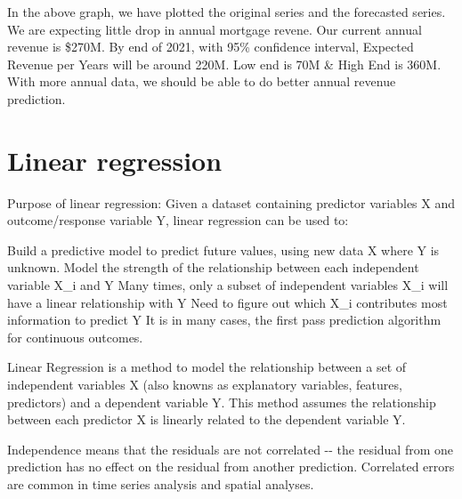 \documentclass[11pt]{article}
\begin{document}
    In the above graph, we have plotted the original series and the
forecasted series. We are expecting little drop in annual mortgage
revene. Our current annual revenue is \$270M. By end of 2021, with 95\%
confidence interval, Expected Revenue per Years will be around 220M. Low
end is 70M \& High End is 360M. With more annual data, we should be able
to do better annual revenue prediction.

    \section{Linear regression}\label{linear-regression}

Purpose of linear regression: Given a dataset containing predictor
variables X and outcome/response variable Y, linear regression can be
used to:

Build a predictive model to predict future values, using new data X
where Y is unknown. Model the strength of the relationship between each
independent variable X\_i and Y Many times, only a subset of independent
variables X\_i will have a linear relationship with Y Need to figure out
which X\_i contributes most information to predict Y It is in many
cases, the first pass prediction algorithm for continuous outcomes.

Linear Regression is a method to model the relationship between a set of
independent variables X (also knowns as explanatory variables, features,
predictors) and a dependent variable Y. This method assumes the
relationship between each predictor X is linearly related to the
dependent variable Y.

Independence means that the residuals are not correlated -\/- the
residual from one prediction has no effect on the residual from another
prediction. Correlated errors are common in time series analysis and
spatial analyses.
\end{document}
